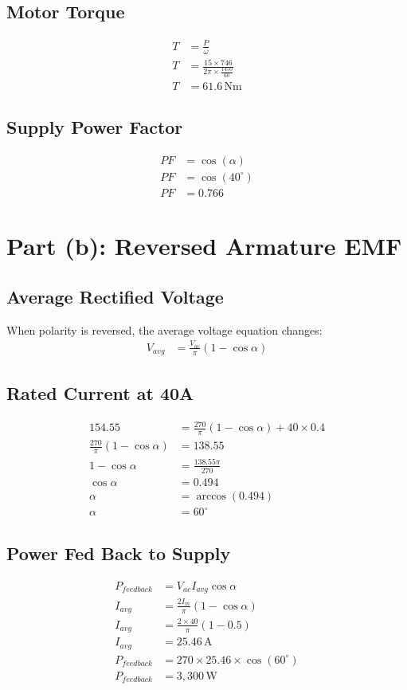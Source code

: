 \documentclass[12pt]{report}
\begin{document}
\subsection*{Motor Torque}
\begin{align*}
	T &= \frac{P}{\omega} \\
	T &= \frac{15 \times 746}{2 \pi \times \frac{1450}{60}} \\
	T &= 61.6 \, \text{Nm}
\end{align*}

\subsection*{Supply Power Factor}
\begin{align*}
	PF &= \cos(\alpha) \\
	PF &= \cos(40^\circ) \\
	PF &= 0.766
\end{align*}

\section*{Part (b): Reversed Armature EMF}

\subsection*{Average Rectified Voltage}
When polarity is reversed, the average voltage equation changes:
\begin{align*}
	V_{avg} &= \frac{V_{ac}}{\pi} (1 - \cos \alpha)
\end{align*}

\subsection*{Rated Current at 40A}
\begin{align*}
	154.55 &= \frac{270}{\pi} (1 - \cos \alpha) + 40 \times 0.4 \\
	\frac{270}{\pi} (1 - \cos \alpha) &= 138.55 \\
	1 - \cos \alpha &= \frac{138.55 \pi}{270} \\
	\cos \alpha &= 0.494 \\
	\alpha &= \arccos(0.494) \\
	\alpha &= 60^\circ
\end{align*}

\subsection*{Power Fed Back to Supply}
\begin{align*}
	P_{feedback} &= V_{ac} I_{avg} \cos \alpha \\
	I_{avg} &= \frac{2I_m}{\pi} (1 - \cos \alpha) \\
	I_{avg} &= \frac{2 \times 40}{\pi} (1 - 0.5) \\
	I_{avg} &= 25.46 \, \text{A} \\
	P_{feedback} &= 270 \times 25.46 \times \cos(60^\circ) \\
	P_{feedback} &= 3{,}300 \, \text{W}
\end{align*}
	
\end{document}
